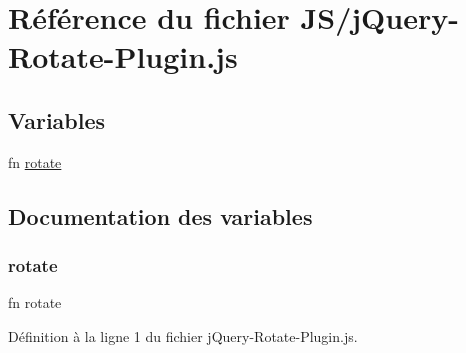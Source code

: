 \hypertarget{j_query-_rotate-_plugin_8js}{}\section{Référence du fichier J\+S/j\+Query-\/\+Rotate-\/\+Plugin.js}
\label{j_query-_rotate-_plugin_8js}
\subsection*{Variables}
\begin{DoxyCompactItemize}
\item 
fn \mbox{\hyperlink{j_query-_rotate-_plugin_8js_ad8a7f90ccace320986b76b89ae173b83}{rotate}}
\end{DoxyCompactItemize}


\subsection{Documentation des variables}
\mbox{\label{j_query-_rotate-_plugin_8js_ad8a7f90ccace320986b76b89ae173b83}} 
\subsubsection{\texorpdfstring{rotate}{rotate}}
{\footnotesize\ttfamily fn rotate}



Définition à la ligne 1 du fichier j\+Query-\/\+Rotate-\/\+Plugin.\+js.

